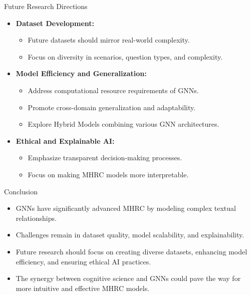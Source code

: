 \documentclass[10pt]{beamer}
\begin{document}
\begin{frame}{Future Research Directions}
  \begin{itemize}
    \item \textbf{Dataset Development:}
      \begin{itemize}
        \item Future datasets should mirror real-world complexity.
        \item Focus on diversity in scenarios, question types, and complexity.
      \end{itemize}
    \item \textbf{Model Efficiency and Generalization:}
      \begin{itemize}
        \item Address computational resource requirements of GNNs.
        \item Promote cross-domain generalization and adaptability.
        \item Explore Hybrid Models combining various GNN architectures.
      \end{itemize}
    \item \textbf{Ethical and Explainable AI:}
      \begin{itemize}
        \item Emphasize transparent decision-making processes.
        \item Focus on making MHRC models more interpretable.
      \end{itemize}
  \end{itemize}
\end{frame}

\begin{frame}{Conclusion}
  \begin{itemize}
    \item GNNs have significantly advanced MHRC by modeling complex textual relationships.
    \item Challenges remain in dataset quality, model scalability, and explainability.
    \item Future research should focus on creating diverse datasets, enhancing model efficiency, and ensuring ethical AI practices.
    \item The synergy between cognitive science and GNNs could pave the way for more intuitive and effective MHRC models.
  \end{itemize}
\end{frame}




\end{document}
